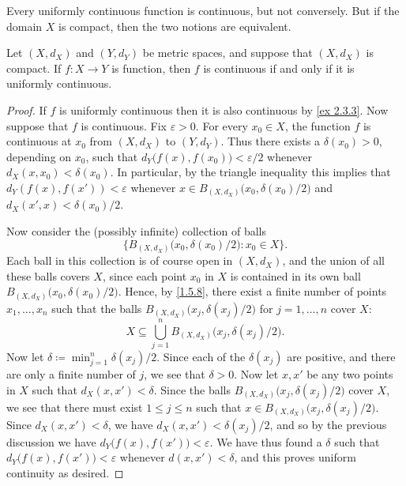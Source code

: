 \begin{note}
  Every uniformly continuous function is continuous, but not conversely.
  But if the domain \(X\) is compact, then the two notions are equivalent.
\end{note}

\begin{theorem}\label{2.3.5}
  Let \((X, d_X)\) and \((Y, d_Y)\) be metric spaces, and suppose that \((X, d_X)\) is compact.
  If \(f : X \to Y\) is function, then \(f\) is continuous if and only if it is uniformly continuous.
\end{theorem}

\begin{proof}
  If \(f\) is uniformly continuous then it is also continuous by \cref{ex 2.3.3}.
  Now suppose that \(f\) is continuous.
  Fix \(\varepsilon > 0\).
  For every \(x_0 \in X\), the function \(f\) is continuous at \(x_0\) from \((X, d_X)\) to \((Y, d_Y)\).
  Thus there exists a \(\delta(x_0) > 0\), depending on \(x_0\), such that \(d_Y\big(f(x), f(x_0)\big) < \varepsilon / 2\) whenever \(d_X(x, x_0) < \delta(x_0)\).
  In particular, by the triangle inequality this implies that \(d_Y(f(x), f(x')) < \varepsilon\) whenever \(x \in B_{(X, d_X)}\big(x_0, \delta(x_0) / 2\big)\) and \(d_X(x', x) < \delta(x_0) / 2\).

  Now consider the (possibly infinite) collection of balls
  \[
    \Big\{B_{(X, d_X)}\big(x_0, \delta(x_0) / 2\big) : x_0 \in X\Big\}.
  \]
  Each ball in this collection is of course open in \((X, d_X)\), and the union of all these balls covers \(X\), since each point \(x_0\) in \(X\) is contained in its own ball \(B_{(X, d_X)}\big(x_0, \delta(x_0) / 2\big)\).
  Hence, by \cref{1.5.8}, there exist a finite number of points \(x_1, \dots, x_n\) such that the balls \(B_{(X, d_X)}\big(x_j, \delta(x_j) / 2\big)\) for \(j = 1, \dots, n\) cover \(X\):
  \[
    X \subseteq \bigcup_{j = 1}^n B_{(X, d_X)}\big(x_j, \delta(x_j) / 2\big).
  \]
  Now let \(\delta \coloneqq \min_{j = 1}^n \delta(x_j) / 2\).
  Since each of the \(\delta(x_j)\) are positive, and there are only a finite number of \(j\), we see that \(\delta > 0\).
  Now let \(x, x'\) be any two points in \(X\) such that \(d_X(x, x') < \delta\).
  Since the balls \(B_{(X, d_X)}\big(x_j, \delta(x_j) / 2\big)\) cover \(X\), we see that there must exist \(1 \leq j \leq n\) such that \(x \in B_{(X, d_X)}\big(x_j, \delta(x_j) / 2\big)\).
  Since \(d_X(x, x') < \delta\), we have \(d_X(x, x') < \delta(x_j) / 2\), and so by the previous discussion we have \(d_Y\big(f(x), f(x')\big) < \varepsilon\).
  We have thus found a \(\delta\) such that \(d_Y\big(f(x), f(x')\big) < \varepsilon\) whenever \(d(x, x') < \delta\), and this proves uniform continuity as desired.
\end{proof}


